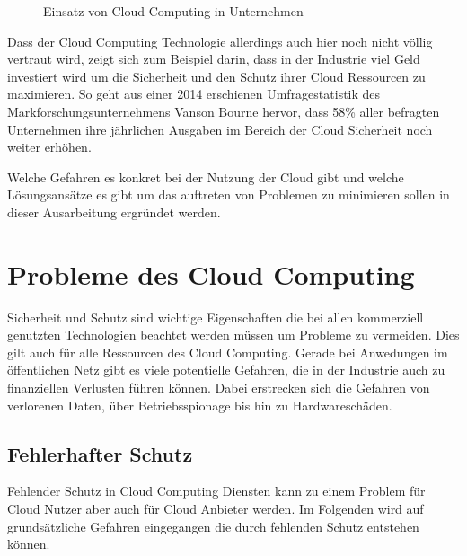\begin{figure}[t]
{
	}
	\caption{Einsatz von Cloud Computing in Unternehmen \cite{heidkamp2020}}
	\label{tab:cloudanstieg}
\end{figure}


Dass der Cloud Computing Technologie allerdings auch hier noch nicht völlig vertraut wird, zeigt sich zum Beispiel darin, dass in der Industrie viel Geld investiert wird um die Sicherheit und den Schutz ihrer Cloud Ressourcen zu maximieren. So geht aus einer 2014 erschienen Umfragestatistik des Markforschungsunternehmens Vanson Bourne \cite{vansonbourne2014} hervor, dass 58\% aller befragten Unternehmen ihre jährlichen Ausgaben im Bereich der Cloud Sicherheit noch weiter erhöhen.

Welche Gefahren es konkret bei der Nutzung der Cloud gibt und welche Lösungsansätze es gibt um das auftreten von Problemen zu minimieren sollen in dieser Ausarbeitung ergründet werden.

\section{Probleme des Cloud Computing}
Sicherheit und Schutz sind wichtige Eigenschaften die bei allen kommerziell genutzten Technologien beachtet werden müssen um Probleme zu vermeiden. Dies gilt auch für alle Ressourcen des Cloud Computing. Gerade bei Anwedungen im öffentlichen Netz gibt es viele potentielle Gefahren, die in der Industrie auch zu finanziellen Verlusten führen können. 
Dabei erstrecken sich die Gefahren von verlorenen Daten, über Betriebsspionage bis hin zu Hardwareschäden. 

\subsection{Fehlerhafter Schutz}
\label{sec:fehlender-Schutz}
Fehlender Schutz in Cloud Computing Diensten kann zu einem Problem für Cloud Nutzer aber auch für Cloud Anbieter werden. Im Folgenden wird auf grundsätzliche Gefahren eingegangen die durch fehlenden Schutz entstehen können.

